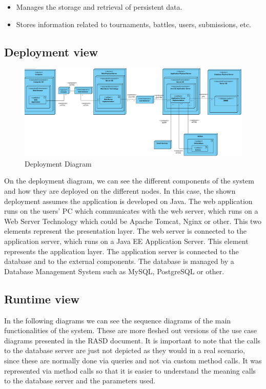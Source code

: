 \documentclass{article}
\begin{document}
\begin{itemize}
    \item Manages the storage and retrieval of persistent data.
    \item Stores information related to tournaments, battles, users, submissions, etc.
\end{itemize}


\subsection{Deployment view}

\begin{figure}[H]
    \centering
    \includegraphics[width=1\textwidth]{images/DeploymentDiagram.png}
    \caption{Deployment Diagram}
    \label{fig:DeploymentDiagram}
\end{figure}

On the deployment diagram, we can see the different components of the system and how they are 
deployed on the different nodes. In this case, the shown deployment assumes the application is developed on Java.
The web application runs on the users' PC which communicates with the
web server, which runs on a Web Server Technology which could be Apache Tomcat, Nginx or other. This two 
elements represent the presentation layer.
The web server is connected to the application server, which runs on a Java EE Application Server. This
element represents the application layer. The application server is connected to the database and to 
the external components. The database is managed by a Database Management System such as MySQL, PostgreSQL or other. 

\newpage

\subsection{Runtime view}

In the following diagrams we can see the sequence diagrams of the main functionalities of the system.
These are more fleshed out versions of the use case diagrams presented in the RASD document. It is important to 
note that the calls to the database server are just not depicted as they would in a real scenario, since these
are normally done via queries and not via custom method calls. It was represented via method calls so that
it is easier to understand the meaning calls to the database server and the parameters used.
\end{document}
